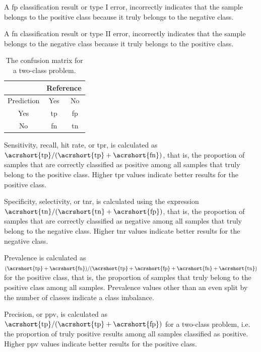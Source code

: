 \documentclass[sn-mathphys-num]{sn-jnl}%
\begin{document}
A \acrfull{fp} classification result or type I error, incorrectly indicates that the sample belongs to the positive class because it truly belongs to the negative class.

A \acrfull{fn} classification result or type II error, incorrectly indicates that the sample belongs to the negative class because it truly belongs to the positive class.

\begin{table}[!ht]
    \centering
    \caption{The confusion matrix for a two-class problem.}
	\label{tab:cm}
	\begin{tabular}{|c|c|c|}
		\hline
		 & \multicolumn{2}{|c|}{Reference} \\ \hline
        Prediction & Yes & No \\ \hline
        Yes &\acrshort{tp} & \acrshort{fp} \\ \hline
        No & \acrshort{fn} & \acrshort{tn} \\ \hline
	\end{tabular}
\end{table}

Sensitivity, recall, hit rate, or \acrfull{tpr}, is calculated as $\mathrm{\acrshort{tp}}/(\mathrm{\acrshort{tp}}+\mathrm{\acrshort{fn}})$, that is, the proportion of samples that are correctly classified as positive among all samples that truly belong to the positive class. Higher \acrshort{tpr} values indicate better results for the positive class.

Specificity, selectivity, or \acrfull{tnr}, is calculated using the expression $\mathrm{\acrshort{tn}}/(\mathrm{\acrshort{tn}}+\mathrm{\acrshort{fp}})$, that is, the proportion of samples that are correctly classified as negative among all samples that truly belong to the negative class. Higher \acrshort{tnr} values indicate better results for the negative class.

Prevalence is calculated as $(\mathrm{\acrshort{tp}}+\mathrm{\acrshort{fn}})/(\mathrm{\acrshort{tp}}+\mathrm{\acrshort{fp}}+\mathrm{\acrshort{fn}}+\mathrm{\acrshort{tn}})$ for the positive class, that is, the proportion of samples that truly belong to the positive class among all samples. Prevalence values other than an even split by the number of classes indicate a class imbalance.

Precision, or \acrfull{ppv}, is calculated as $\mathrm{\acrshort{tp}}/(\mathrm{\acrshort{tp}}+\mathrm{\acrshort{fp}})$ for a two-class problem, i.e. the proportion of truly positive results among all samples classified as positive. Higher \acrshort{ppv} values indicate better results for the positive class.
\end{document}
